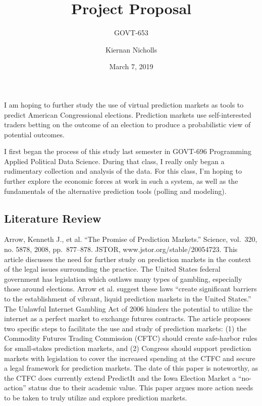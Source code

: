 \documentclass[]{article}
\title{Project Proposal}
\subtitle{GOVT-653}
\author{Kiernan Nicholls}
\date{March 7, 2019}
\begin{document}
\maketitle

I am hoping to further study the use of virtual prediction markets as
tools to predict American Congressional elections. Prediction markets
use self-interested traders betting on the outcome of an election to
produce a probabilistic view of potential outcomes.

I first began the process of this study last semester in GOVT-696
Programming Applied Political Data Science. During that class, I really
only began a rudimentary collection and analysis of the data. For this
class, I'm hoping to further explore the economic forces at work in such
a system, as well as the fundamentals of the alternative prediction
tools (polling and modeling).

\subsection{Literature Review}\label{literature-review}

Arrow, Kenneth J., et al. ``The Promise of Prediction Markets.''
Science, vol.~320, no. 5878, 2008, pp.~877--878. JSTOR,
www.jstor.org/stable/20054723. This article discusses the need for
further study on prediction markets in the context of the legal issues
surrounding the practice. The United States federal government has
legislation which outlaws many types of gambling, especially those
around elections. Arrow et al. suggest these laws ``create significant
barriers to the establishment of vibrant, liquid prediction markets in
the United States.'' The Unlawful Internet Gambling Act of 2006 hinders
the potential to utilize the internet as a perfect market to exchange
futures contracts. The article proposes two specific steps to facilitate
the use and study of prediction markets: (1) the Commodity Futures
Trading Commission (CFTC) should create safe-harbor rules for
small-stakes prediction markets, and (2) Congress should support
prediction markets with legislation to cover the increased spending at
the CTFC and secure a legal framework for prediction markets. The date
of this paper is noteworthy, as the CTFC does currently extend PredictIt
and the Iowa Election Market a ``no-action'' status due to their
academic value. This paper argues more action needs to be taken to truly
utilize and explore prediction markets.
\end{document}
